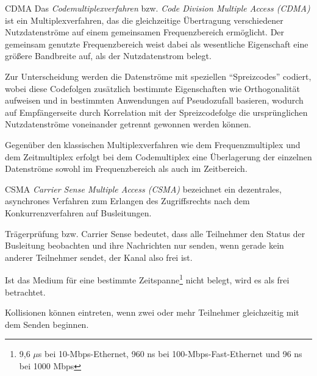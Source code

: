 \begin{defi}{CDMA}
    Das \emph{Codemultiplexverfahren} bzw. \emph{Code Division Multiple Access (CDMA)} ist ein Multiplexverfahren, das die gleichzeitige Übertragung verschiedener Nutzdatenströme auf einem gemeinsamen Frequenzbereich ermöglicht. Der gemeinsam genutzte Frequenzbereich weist dabei als wesentliche Eigenschaft eine größere Bandbreite auf, als der Nutzdatenstrom belegt.

    Zur Unterscheidung werden die Datenströme mit speziellen \enquote{Spreizcodes} codiert, wobei diese Codefolgen zusätzlich bestimmte Eigenschaften wie Orthogonalität aufweisen und in bestimmten Anwendungen auf Pseudozufall basieren, wodurch auf Empfängerseite durch Korrelation mit der Spreizcodefolge die ursprünglichen Nutzdatenströme voneinander getrennt gewonnen werden können.

    Gegenüber den klassischen Multiplexverfahren wie dem Frequenzmultiplex und dem Zeitmultiplex erfolgt bei dem Codemultiplex eine Überlagerung der einzelnen Datenströme sowohl im Frequenzbereich als auch im Zeitbereich.
\end{defi}

\begin{defi}{CSMA}
    \emph{Carrier Sense Multiple Access (CSMA)} bezeichnet ein dezentrales, asynchrones Verfahren zum Erlangen des Zugriffsrechts nach dem Konkurrenzverfahren auf Busleitungen.

    Trägerprüfung bzw. Carrier Sense bedeutet, dass alle Teilnehmer den Status der Busleitung beobachten und ihre Nachrichten nur senden, wenn gerade kein anderer Teilnehmer sendet, der Kanal also frei ist.

    Ist das Medium für eine bestimmte Zeitspanne\footnote{9,6 $\mu$s bei 10-Mbps-Ethernet, 960 ns bei 100-Mbps-Fast-Ethernet und 96 ns bei 1000 Mbps} nicht belegt, wird es als frei betrachtet.

    Kollisionen können eintreten, wenn zwei oder mehr Teilnehmer gleichzeitig mit dem Senden beginnen.
\end{defi}

